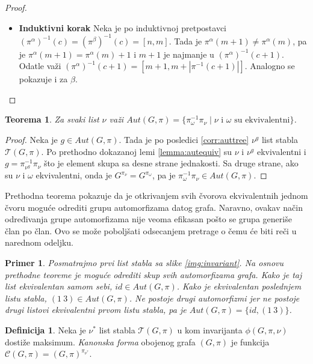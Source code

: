 \documentclass[12pt,oneside]{memoir}
\newtheorem{theorem}{Teorema}
\newtheorem{example}{Primer}
\theoremstyle{definition}
\newtheorem*{definition}{Definicija}
\begin{document}
\begin{proof}
\begin{enumerate}
\begin{itemize}
				  \item[] \textbf{Induktivni korak} Neka je po induktivnoj
					  pretpostavci $(\pi^\alpha)^{-1}(c) = (\pi^\beta)^{-1}(c)
					  = [n, m]$. Tada je $\pi^\alpha(m+1) \neq \pi^\alpha(m)$,
					  pa je $\pi^\alpha(m+1) = \pi^\alpha(m) + 1$ i $m+1$ je
					  najmanje u $(\pi^\alpha)^{-1}(c+1)$. Odatle važi
					  $(\pi^\alpha)^{-1}(c+1) = [m + 1, m + |\pi^{-1}(c+1)|]$.
					  Analogno se pokazuje i za $\beta$.
			  \end{itemize}
	  \end{enumerate}
  \end{proof}

  \begin{theorem}
	  \label{thm:aut}
	  Za svaki list $\nu$ važi $Aut(G, \pi) = \{\pi_{\omega}^{-1}\pi_{\nu}
	  \mid \text{$\nu$ i $\omega$ su ekvivalentni} \}$.
  \end{theorem}
  
  \begin{proof}
	  Neka je $g \in Aut(G, \pi)$. Tada je po posledici \ref{corr:auttree}
	  $\nu^g$ list stabla $\mathcal{T}(G, \pi)$. Po prethodno dokazanoj lemi
	  \ref{lemma:autequiv} su $\nu$ i $\nu^g$ ekvivalentni i $g =
	  \pi_{\nu^g}^{-1}\pi_\nu$ što je element skupa sa desne strane jednakosti.
	  Sa druge strane, ako su $\nu$ i $\omega$ ekvivalentni, onda je
	  $G^{\pi_\nu} = G^{\pi_\omega}$, pa je $\pi_\omega^{-1}\pi_\nu \in Aut(G,
	  \pi)$.
  \end{proof}

	Prethodna teorema pokazuje da je otkrivanjem svih čvorova ekvivalentnih
	jednom čvoru moguće odrediti grupu automorfizama datog grafa. Naravno,
	ovakav način određivanja grupe automorfizama nije veoma efikasan pošto se
	grupa generiše član po član. Ovo se može poboljšati odsecanjem pretrage o
	čemu će biti reči u narednom odeljku.
	
	\begin{example}
		Posmatrajmo prvi list stabla sa slike \ref{img:invariant}. Na osnovu
		prethodne teoreme je moguće odrediti skup svih automorfizama grafa.
		Kako je taj list ekvivalentan samom sebi, $id \in Aut(G, \pi)$.  Kako
		je ekvivalentan poslednjem listu stabla, $(1\ 3) \in Aut(G, \pi)$. Ne
		postoje drugi automorfizmi jer ne postoje drugi listovi ekvivalentni
		prvom listu stabla, pa je $Aut(G, \pi) = \{id, (1\ 3)\}$.
	\end{example}

  \begin{definition}
	  Neka je $\nu^*$ list stabla $\mathcal{T}(G, \pi)$ u kom invarijanta
	  $\phi(G, \pi, \nu)$ dostiže maksimum. \emph{Kanonska forma} obojenog
	  grafa $(G, \pi)$ je funkcija $\mathcal{C}(G, \pi) = (G,
	  \pi)^{\pi_{\nu^*}}$.
  \end{definition}
\end{document}

